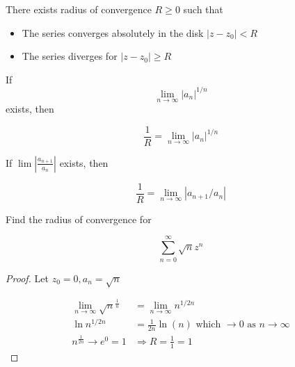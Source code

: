 \documentclass[../notes.tex]{subfiles}
\begin{document}
\begin{theorem}

	There exists radius of convergence $ R \ge 0 $ such that 

	\begin{itemize}
		\item The series converges absolutely in the disk $ |z-z_0| < R $
		\item The series diverges for $ |z-z_0| \ge  R $
	\end{itemize}

	If
	\begin{equation}
		\lim_{n \to \infty} |a_n|^{1 /n}
	\end{equation}
	exists, then

	\begin{equation}
		\frac{1}{R} = \lim_{n \to \infty} |a_n|^{1 /n}
	\end{equation}

	\begin{lemma}
	If $ \lim | \frac{a_{n+1}}{a_n}|$ exists, then 

	\begin{equation}
		\frac{1}{R} = \lim_{n \to \infty} | a_{n+1}/a_n |
	\end{equation}
	
	\end{lemma}
\end{theorem}

\begin{example}
	Find the radius of convergence for 

	\begin{equation}
		\sum_{n=0}^{\infty} \sqrt{n} z^n
	\end{equation}

	\begin{proof}

	Let $ z_0 = 0, a_n = \sqrt{n}  $ 

	\begin{equation}
		\begin{split}
			\lim_{n \to \infty} \sqrt{n} ^{\frac{1}{n}}  &= \lim_{n \to \infty} n^{1 /2n}  \\
			  \ln n^{1 /2n} &= \frac{1}{2n} \ln(n) \text{ which } \to 0 \text{ as } n \to \infty \\
				n^{\frac{1}{2n}} \rightarrow e^0 = 1 &\Rightarrow R = \frac{1}{1} = 1
		\end{split}
	\end{equation}
	
		
	\end{proof}
	
	
\end{example}
\end{document}
